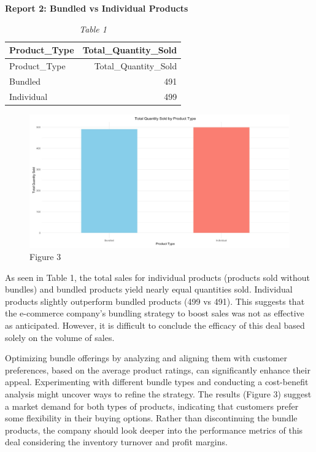\documentclass[
  letterpaper,
  DIV=11,
  numbers=noendperiod]{scrartcl}
\begin{document}
\textbf{Report 2: Bundled vs Individual Products}

\begin{longtable}[]{@{}lr@{}}
\caption{\emph{Table 1}}\tabularnewline
\toprule\noalign{}
Product\_Type & Total\_Quantity\_Sold \\
\midrule\noalign{}
\endfirsthead
\toprule\noalign{}
Product\_Type & Total\_Quantity\_Sold \\
\midrule\noalign{}
\endhead
\bottomrule\noalign{}
\endlastfoot
Bundled & 491 \\
Individual & 499 \\
\end{longtable}

\begin{figure}

{\centering \includegraphics{images/Figure 3.jpeg}

}

\caption{Figure 3}

\end{figure}

As seen in Table 1, the total sales for individual products (products
sold without bundles) and bundled products yield nearly equal quantities
sold. Individual products slightly outperform bundled products (499 vs
491). This suggests that the e-commerce company's bundling strategy to
boost sales was not as effective as anticipated. However, it is
difficult to conclude the efficacy of this deal based solely on the
volume of sales.

Optimizing bundle offerings by analyzing and aligning them with customer
preferences, based on the average product ratings, can significantly
enhance their appeal. Experimenting with different bundle types and
conducting a cost-benefit analysis might uncover ways to refine the
strategy. The results (Figure 3) suggest a market demand for both types
of products, indicating that customers prefer some flexibility in their
buying options. Rather than discontinuing the bundle products, the
company should look deeper into the performance metrics of this deal
considering the inventory turnover and profit margins.
\end{document}
